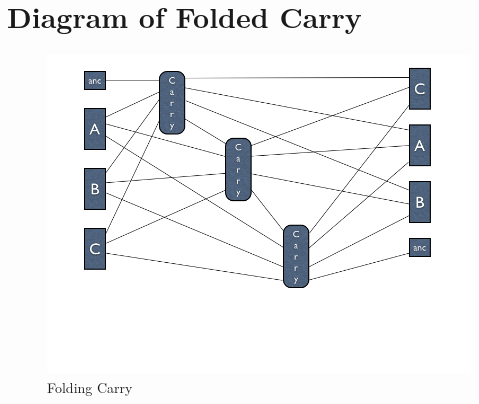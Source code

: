 \section{Diagram of Folded Carry} %
\label{sec:diagram_of_folded_carry}
\begin{figure}[htbp]
  \centering
    \includegraphics[scale=.6]{diagrams/FoldedCarry.png}
  \caption{Folding Carry}
  \label{fig:folding_carry}
\end{figure}
